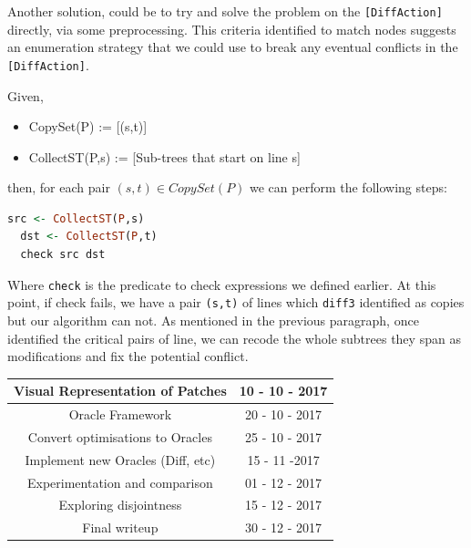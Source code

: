 \documentclass[11pt]{article}
\begin{document}
Another solution, could be to try and solve the problem on the \texttt{[DiffAction]} directly, via some preprocessing.
This criteria identified to match nodes suggests an enumeration strategy that we 
could use to break any eventual conflicts in the \texttt{[DiffAction]}. 

Given,
\begin{itemize}
  \item CopySet(P) := [(s,t)]
  \item CollectST(P,s) := [Sub-trees that start on line s]
\end{itemize}
then, for each pair $(s,t) \in CopySet(P)$ we can perform the following steps:
\begin{lstlisting}[language=haskell]
  src <- CollectST(P,s)
  dst <- CollectST(P,t)
  check src dst
\end{lstlisting}

Where \texttt{check} is the predicate to check expressions we defined earlier. 
At this point, if check fails, we have a pair \texttt{(s,t)} of lines which 
\texttt{diff3} identified as copies but our algorithm can not. As mentioned in the previous 
paragraph, once identified the critical pairs of line, we can recode the whole 
subtrees they span as modifications and fix the potential conflict.


%



\begin{center}
 \begin{tabular} { ||c|c|| }
   \hline Visual Representation of Patches & 10 - 10 - 2017 \\
   \hline
   \hline Oracle Framework & 20 - 10 - 2017 \\ 
   \hline Convert optimisations to Oracles & 25 - 10 - 2017 \\
   \hline Implement new Oracles (Diff, etc) & 15 - 11 -2017 \\ 
   \hline Experimentation and comparison & 01 - 12 - 2017 \\ 
   \hline
   \hline Exploring disjointness & 15 - 12 - 2017 \\
   \hline
   \hline Final writeup & 30 - 12 - 2017 \\
   \hline
 \end{tabular}
\end{center}
\end{document}
